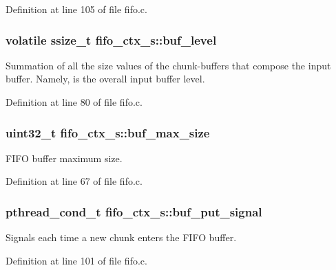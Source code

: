 Definition at line 105 of file fifo.\+c.

\subsubsection[{\texorpdfstring{buf\+\_\+level}{buf_level}}]{\setlength{\rightskip}{0pt plus 5cm}volatile ssize\+\_\+t fifo\+\_\+ctx\+\_\+s\+::buf\+\_\+level}\hypertarget{structfifo__ctx__s_a9661ff316afd08e4eb0919cd02e355ce}{}\label{structfifo__ctx__s_a9661ff316afd08e4eb0919cd02e355ce}
Summation of all the size values of the chunk-\/buffers that compose the input buffer. Namely, is the overall input buffer level. 

Definition at line 80 of file fifo.\+c.

\subsubsection[{\texorpdfstring{buf\+\_\+max\+\_\+size}{buf_max_size}}]{\setlength{\rightskip}{0pt plus 5cm}uint32\+\_\+t fifo\+\_\+ctx\+\_\+s\+::buf\+\_\+max\+\_\+size}\hypertarget{structfifo__ctx__s_ac2945108d1eec583f5cb70f1dcafa479}{}\label{structfifo__ctx__s_ac2945108d1eec583f5cb70f1dcafa479}
F\+I\+FO buffer maximum size. 

Definition at line 67 of file fifo.\+c.

\subsubsection[{\texorpdfstring{buf\+\_\+put\+\_\+signal}{buf_put_signal}}]{\setlength{\rightskip}{0pt plus 5cm}pthread\+\_\+cond\+\_\+t fifo\+\_\+ctx\+\_\+s\+::buf\+\_\+put\+\_\+signal}\hypertarget{structfifo__ctx__s_a3f9e6f9e1505a9f7e1756c212602a9df}{}\label{structfifo__ctx__s_a3f9e6f9e1505a9f7e1756c212602a9df}
Signals each time a new chunk enters the F\+I\+FO buffer. 

Definition at line 101 of file fifo.\+c.

